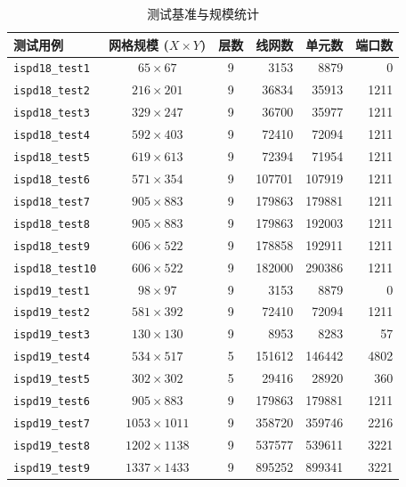 \begin{table}[!htbp]
    \centering
    \caption{测试基准与规模统计}
    \label{tab:chap3-benchmark-placeholder}
    \small
    \setlength{\tabcolsep}{4.2pt}
    \renewcommand{\arraystretch}{1.10}
    \begin{tabular}{l c c r r r}
        \hline
        测试用例 & 网格规模 ($X\times Y$) & 层数 & 线网数 & 单元数 & 端口数 \\
        \hline
        \texttt{ispd18\_test1} & $65\times67$ & 9 & 3153 & 8879 & 0 \\
        \texttt{ispd18\_test2} & $216\times201$ & 9 & 36834 & 35913 & 1211 \\
        \texttt{ispd18\_test3} & $329\times247$ & 9 & 36700 & 35977 & 1211 \\
        \texttt{ispd18\_test4} & $592\times403$ & 9 & 72410 & 72094 & 1211 \\
        \texttt{ispd18\_test5} & $619\times613$ & 9 & 72394 & 71954 & 1211 \\
        \texttt{ispd18\_test6} & $571\times354$ & 9 & 107701 & 107919 & 1211 \\
        \texttt{ispd18\_test7} & $905\times883$ & 9 & 179863 & 179881 & 1211 \\
        \texttt{ispd18\_test8} & $905\times883$ & 9 & 179863 & 192003 & 1211 \\
        \texttt{ispd18\_test9} & $606\times522$ & 9 & 178858 & 192911 & 1211 \\
        \texttt{ispd18\_test10} & $606\times522$ & 9 & 182000 & 290386 & 1211 \\
        \texttt{ispd19\_test1} & $98\times97$ & 9 & 3153 & 8879 & 0 \\
        \texttt{ispd19\_test2} & $581\times392$ & 9 & 72410 & 72094 & 1211 \\
        \texttt{ispd19\_test3} & $130\times130$ & 9 & 8953 & 8283 & 57 \\
        \texttt{ispd19\_test4} & $534\times517$ & 5 & 151612 & 146442 & 4802 \\
        \texttt{ispd19\_test5} & $302\times302$ & 5 & 29416 & 28920 & 360 \\
        \texttt{ispd19\_test6} & $905\times883$ & 9 & 179863 & 179881 & 1211 \\
        \texttt{ispd19\_test7} & $1053\times1011$ & 9 & 358720 & 359746 & 2216 \\
        \texttt{ispd19\_test8} & $1202\times1138$ & 9 & 537577 & 539611 & 3221 \\
        \texttt{ispd19\_test9} & $1337\times1433$ & 9 & 895252 & 899341 & 3221 \\

\end{tabular}
\end{table}
